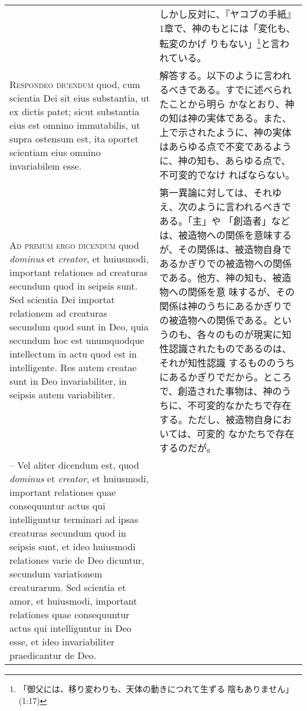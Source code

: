 \documentclass[10pt]{jsarticle} %
\begin{document}
\begin{longtable}{p{21em}p{21em}}
&

しかし反対に、『ヤコブの手紙』1章で、神のもとには「変化も、転変のかげ
りもない」\footnote{「御父には、移り変わりも、天体の動きにつれて生ずる
陰もありません」(1:17)}と言われている。

\\


{\scshape Respondeo dicendum} quod, cum scientia Dei sit
eius substantia, ut ex dictis patet; sicut substantia eius est omnino
immutabilis, ut supra ostensum est, ita oportet scientiam eius omnino
invariabilem esse.

&

解答する。以下のように言われるべきである。すでに述べられたことから明ら
かなとおり、神の知は神の実体である。また、上で示されたように、神の実体
はあらゆる点で不変であるように、神の知も、あらゆる点で、不可変的でなけ
ればならない。

\\


{\scshape Ad primum ergo dicendum} quod {\itshape dominus} et {\itshape
creator}, et huiusmodi, important relationes ad creaturas secundum quod
in seipsis sunt. Sed scientia Dei importat relationem ad creaturas
secundum quod sunt in Deo, quia secundum hoc est unumquodque intellectum
in actu quod est in intelligente. Res autem creatae sunt in Deo
invariabiliter, in seipsis autem variabiliter.

&

第一異論に対しては、それゆえ、次のように言われるべきである。「主」や
「創造者」などは、被造物への関係を意味するが、その関係は、被造物自身で
あるかぎりでの被造物への関係である。他方、神の知も、被造物への関係を意
味するが、その関係は神のうちにあるかぎりでの被造物への関係である。とい
うのも、各々のものが現実に知性認識されたものであるのは、それが知性認識
するもののうちにあるかぎりでだから。ところで、創造された事物は、神のう
ちに、不可変的なかたちで存在する。ただし、被造物自身においては、可変的
なかたちで存在するのだが。

\\


-- Vel aliter dicendum est, quod {\itshape
dominus} et {\itshape creator}, et huiusmodi, important relationes quae
consequuntur actus qui intelliguntur terminari ad ipsas creaturas
secundum quod in seipsis sunt, et ideo huiusmodi relationes varie de Deo
dicuntur, secundum variationem creaturarum. Sed scientia et amor, et
huiusmodi, important relationes quae consequuntur actus qui
intelliguntur in Deo esse, et ideo invariabiliter praedicantur de Deo.


\end{longtable}
\end{document}
